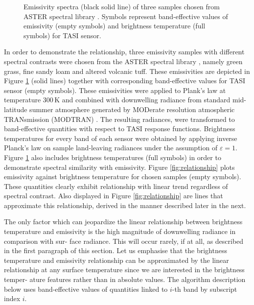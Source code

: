 \begin{figure}[!t]
\begin{subfigure}[t]{.3\linewidth}
		\caption{}
	\end{subfigure}
	\vspace{1.5 em}
	\caption{Emissivity spectra (black solid line) of three samples chosen from ASTER spectral library \cite{BH09}. Symbols represent band-effective values of emissivity (empty symbols) and brightness temperature (full symbols) for TASI sensor. }
	\label{fig:emissivitySpectra_spectra}
\end{figure}

In order to demonstrate the relationship, three emissivity samples with different spectral contrasts were chosen from the ASTER spectral library \cite{BH09}, namely green grass, fine sandy loam and altered volcanic tuff. These emissivities are depicted in Figure \ref{fig:emissivitySpectra_spectra} (solid lines) together with corresponding band-effective values for TASI sensor (empty symbols). These emissivities were applied to Plank's law at temperature $300\,\mathrm{K}$ and combined with downwelling radiance from standard mid-latitude summer atmosphere generated by MODerate resolution atmospheric TRANsmission (MODTRAN) \cite{BG06}. The resulting radiances, were transformed to band-effective quantities with respect to TASI response functions. Brightness temperatures for every band of each sensor were obtained by applying inverse Planck's law on sample land-leaving radiances under the assumption of $\varepsilon=1$. Figure \ref{fig:emissivitySpectra_spectra} also includes brightness temperatures (full symbols) in order to demonstrate spectral similarity with emissivity. Figure \ref{fig:relationship} plots emissivity against brightness temperature for chosen samples (empty symbols). These quantities clearly exhibit relationship with linear trend regardless of spectral contrast. Also displayed in Figure \ref{fig:relationship} are lines that approximate this relationship, derived in the manner described later in the next. 

The only factor which can jeopardize the linear relationship between brightness temperature and emissivity is the high magnitude of downwelling radiance in comparison with sur- face radiance. This will occur rarely, if at all, as described in the first paragraph of this section. Let us emphasise that the brightness temperature and emissivity relationship can be approximated by the linear relationship at any surface temperature since we are interested in the brightness temper- ature features rather than in absolute values. The algorithm description below uses band-effective values of quantities linked to $i$-th band by subscript index $i$. 

